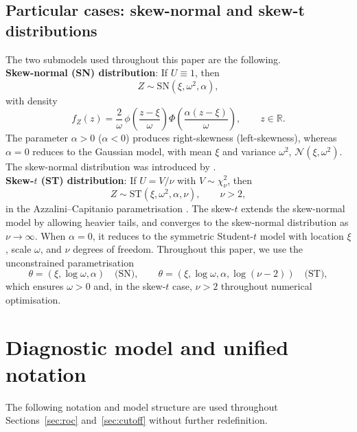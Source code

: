 \documentclass[11pt,a4paper]{article}
\theoremstyle{definition}
\theoremstyle{remark}
\newcommand{\1}{\mathbf{1}}
\begin{document}
\subsection{Particular cases: skew-normal and skew-t distributions}

The two submodels used throughout this paper are the following.\\

\noindent
\textbf{Skew-normal (SN) distribution}:
If $U\equiv 1$, then
\[
Z \sim \mathrm{SN}(\xi,\omega^2,\alpha),
\]
with density
\[
f_Z(z)
=
\frac{2}{\omega}\,
\phi\!\left(\frac{z-\xi}{\omega}\right)
\Phi\!\left(\frac{\alpha(z-\xi)}{\omega}\right),
\qquad z\in\mathbb{R}.
\]
The parameter $\alpha>0$ ($\alpha<0$) produces right-skewness
(left-skewness), whereas $\alpha\!=\!0$ reduces to the Gaussian model, with mean $\xi$ and variance $\omega^2$,
$\mathcal{N}(\xi,\omega^2)$. The skew-normal distribution was introduced by \citet{azzalini1985class}.\\

\noindent
\textbf{Skew-$t$ (ST) distribution}:
If $U=V/\nu$ with $V\sim\chi^2_\nu$, then
\[
Z \sim \mathrm{ST}(\xi,\omega^2,\alpha,\nu),
\qquad \nu>2,
\]
in the Azzalini--Capitanio parametrisation \citep{azzalini2003distributions}.
The skew-$t$ extends the skew-normal model by allowing heavier tails,
and converges to the skew-normal distribution as $\nu\to\infty$.
When $\alpha=0$, it reduces to the symmetric Student-$t$ model
with location $\xi$, scale $\omega$, and $\nu$ degrees of freedom. Throughout this paper, we use the unconstrained parametrisation
\begin{equation}
\label{eq:parametrisation}
\theta =
(\xi,\log\omega,\alpha)
\quad\text{(SN)},
\qquad
\theta =
(\xi,\log\omega,\alpha,\log(\nu-2))
\quad\text{(ST)},
\end{equation}
which ensures $\omega>0$ and, in the skew-$t$ case, $\nu>2$
throughout numerical optimisation.

\section{Diagnostic model and unified notation}
\label{sec:setup}

The following notation and model structure are used throughout
Sections~\ref{sec:roc} and~\ref{sec:cutoff} without further
redefinition.
\end{document}

